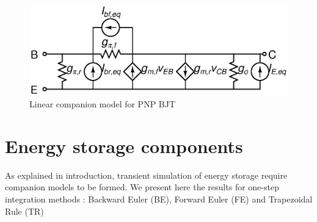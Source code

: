 \documentclass{article}
\begin{document}
\begin{figure}[h]
\begin{center}
\includegraphics{fig/pnp.eps}
\caption{Linear companion model for PNP BJT \label{fig:pnp}}
\end{center}
\end{figure}

\pagebreak

\section{Energy storage components}
As explained in introduction, transient simulation of energy storage require companion models to be formed. We present here the results for one-step integration methods : Backward Euler (BE), Forward Euler (FE) and Trapezoidal Rule (TR)
\end{document}
